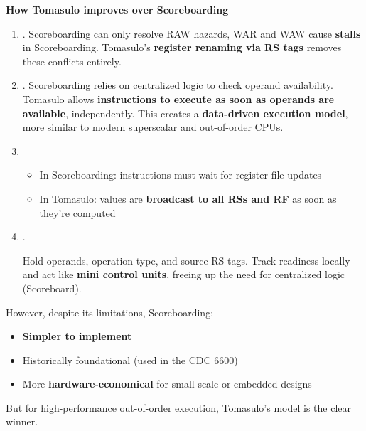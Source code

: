 \begin{flushleft}
    \textcolor{Green3}{\faIcon{\speedIcon} \textbf{How Tomasulo improves over Scoreboarding}}
\end{flushleft}
\begin{enumerate}
    \item {}. Scoreboarding can only resolve RAW hazards, WAR and WAW cause \textbf{stalls} in Scoreboarding. Tomasulo's \textbf{register renaming via RS tags} removes these conflicts entirely.
    \item {}. Scoreboarding relies on centralized logic to check operand availability. Tomasulo allows \textbf{instructions to execute as soon as operands are available}, independently. This creates a \textbf{data-driven execution model}, more similar to modern superscalar and out-of-order CPUs.
    \item {}
    \begin{itemize}
        \item In Scoreboarding: instructions must wait for register file updates
        \item In Tomasulo: values are \textbf{broadcast to all RSs and RF} as soon as they're computed
    \end{itemize}
    \item {}.
    
    Hold operands, operation type, and source RS tags. Track readiness locally and act like \textbf{mini control units}, freeing up the need for centralized logic (Scoreboard).
\end{enumerate}
However, despite its limitations, Scoreboarding:
\begin{itemize}
    \item \textbf{Simpler to implement}
    \item Historically foundational (used in the CDC 6600)
    \item More \textbf{hardware-economical} for small-scale or embedded designs
\end{itemize}
But for high-performance out-of-order execution, Tomasulo's model is the clear winner.

\newpage

